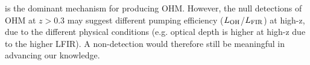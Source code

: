 \documentclass[letterpaper,11pt]{article}
\newcommand{\LFIR}{\mbox{$L_{\rm FIR}$}\xspace}
\newcommand{\LOH}{$L_{\rm OH}$\xspace}
\newcommand{\ssim}{\,$\sim$\,}
\begin{document}
is the dominant mechanism for producing OHM. However, the null detections of OHM at $z$$>$0.3
\citep{Ivison06a, Willet12a} may suggest different pumping efficiency (\LOH/\LFIR) at high-z, due to the different physical conditions (e.g. 
optical depth is higher at high-z due to the higher LFIR). 
% 
% 
A non-detection would therefore still be meaningful in advancing our knowledge. 


\end{document}
